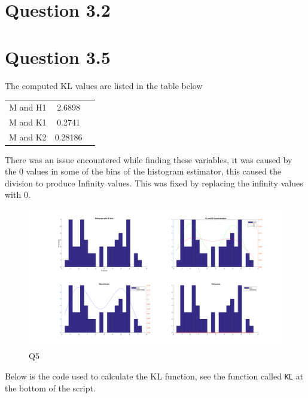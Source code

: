 \section*{Question 3.2}

\section*{Question 3.5}

The computed KL values are listed in the table below
\begin{center}
    \begin{tabular}{|c|c|c|}
        \hline
        M and H1 & 2.6898 \\
        M and K1 & 0.2741  \\
        M and K2 & 0.28186 \\
        \hline
    \end{tabular}
\end{center}

There was an issue encountered while finding these variables, it was caused by the 0 values in some of the bins of the histogram estimator, this caused the division to produce Infinity values. This was fixed by replacing the infinity values with 0.

\begin{figure}[H]
    \includegraphics[width=\linewidth]{../../pracs/week4/images/q5}
    \centering
    \caption{Q5}
\end{figure}

Below is the code used to calculate the KL function, see the function called \texttt{KL} at the bottom of the script.




